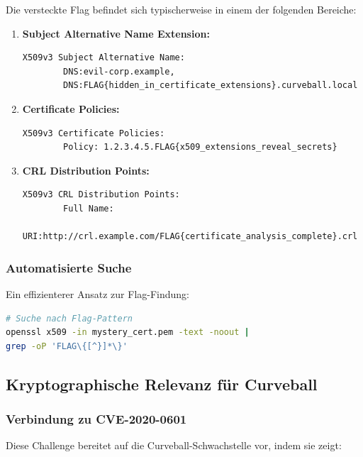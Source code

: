 \documentclass{article}
\begin{document}
Die versteckte Flag befindet sich typischerweise in einem der folgenden Bereiche:

\begin{enumerate}[leftmargin=1.5cm]
    \item \textbf{Subject Alternative Name Extension:} 
    \begin{lstlisting}[caption=SAN Extension mit Flag]
    X509v3 Subject Alternative Name:
        DNS:evil-corp.example, 
        DNS:FLAG{hidden_in_certificate_extensions}.curveball.local
    \end{lstlisting}
    
    \item \textbf{Certificate Policies:}
    \begin{lstlisting}[caption=Certificate Policies mit Flag]
    X509v3 Certificate Policies:
        Policy: 1.2.3.4.5.FLAG{x509_extensions_reveal_secrets}
    \end{lstlisting}
    
    \item \textbf{CRL Distribution Points:}
    \begin{lstlisting}[caption=CRL Distribution Points mit Flag]
    X509v3 CRL Distribution Points:
        Full Name:
          URI:http://crl.example.com/FLAG{certificate_analysis_complete}.crl
    \end{lstlisting}
\end{enumerate}

\subsubsection{Automatisierte Suche}
Ein effizienterer Ansatz zur Flag-Findung:

\begin{lstlisting}[language=bash,caption={Automatisierte Flag-Suche}]
# Suche nach Flag-Pattern
openssl x509 -in mystery_cert.pem -text -noout | 
grep -oP 'FLAG\{[^}]*\}'
\end{lstlisting}

\subsection{Kryptographische Relevanz für Curveball}

\subsubsection{Verbindung zu CVE-2020-0601}
Diese Challenge bereitet auf die Curveball-Schwachstelle vor, indem sie zeigt:
\end{document}
